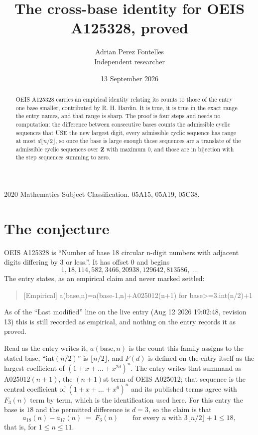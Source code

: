 \documentclass[11pt,a4paper]{article}
\title{The cross-base identity for OEIS A125328, proved}
\author{Adrian Perez Fontelles\\ \small Independent researcher}
\date{13 September 2026}
\theoremstyle{plain}
\theoremstyle{definition}
\begin{document}
\maketitle

\begin{abstract}
OEIS A125328 carries an empirical identity relating its counts to those of the entry one base
smaller, contributed by R. H. Hardin. It is true, it is true in the exact range the entry
names, and that range is sharp. The proof is four steps and needs no computation: the
difference between consecutive bases counts the admissible cyclic sequences that USE the new
largest digit, every admissible cyclic sequence has range at most $d\lfloor n/2\rfloor$, so
once the base is large enough those sequences are a translate of the admissible cyclic
sequences over $\mathbf{Z}$ with maximum $0$, and those are in bijection with the step
sequences summing to zero.
\end{abstract}

\noindent\small 2020 Mathematics Subject Classification. 05A15, 05A19, 05C38.\normalsize

\section{The conjecture}

OEIS A125328 is ``Number of base 18 circular n-digit numbers with adjacent digits differing by 3 or less.''. It has offset $0$ and begins
\[
1, 18, 114, 582, 3466, 20938, 129642, 813586,\ \dots
\]
The entry states, as an empirical claim and never marked settled:
\begin{quote}
[Empirical] a(base,n)=a(base-1,n)+A025012(n+1) for base>=3.int(n/2)+1
\end{quote}
As of the ``Last modified'' line on the live entry (Aug 12 2026 19:02:48, revision 13)
this is still recorded as empirical, and nothing on the entry records it as proved.

Read as the entry writes it, $a(\mathrm{base},n)$ is the count this family assigns to the
stated base, ``$\mathrm{int}(n/2)$'' is $\lfloor n/2\rfloor$, and $F(d)$ is defined on the
entry itself as the largest coefficient of $(1+x+\dots+x^{2d})^{n}$. The entry writes that summand as $\mathrm{A025012}(n+1)$, the $(n+1)$st term of OEIS A025012; that sequence is the central coefficient of $(1+x+\dots+x^{6})^{n}$ and its published terms agree with $F_{3}(n)$ term by term, which is the identification used here. For this entry
the base is $18$ and the permitted difference is $d=3$, so the claim is that
\[
a_{18}(n)-a_{17}(n)\;=\;F_{3}(n)
\qquad\text{for every } n \text{ with } 3\lfloor n/2\rfloor+1\le18,
\]
that is, for $1\le n\le11$.
\end{document}
